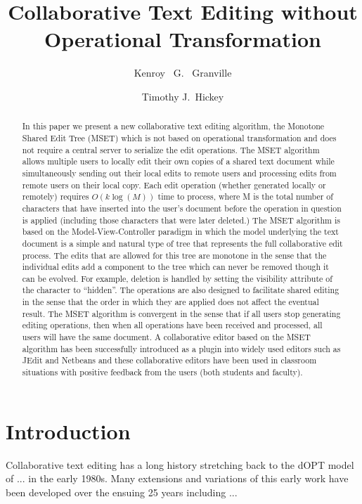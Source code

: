 \documentclass{amsart}
\title{Collaborative Text Editing without Operational Transformation}
\author{
Kenroy~ G.~ Granville
\and 
Timothy J.~Hickey 
}
\begin{document}
\maketitle

\begin{abstract}
In this paper we present a new collaborative text editing algorithm,  
the Monotone Shared Edit Tree (MSET)
which is not based on operational transformation 
and does not require a central server to serialize the
edit operations.
The MSET algorithm allows multiple users to locally 
edit their own copies of a shared text document
while simultaneously sending out their local edits 
to remote users and processing edits from remote users 
on their local copy.
Each edit operation (whether generated locally or remotely) 
requires $O(k\log(M))$ time to process, where
M is the total number of characters that have inserted 
into the user's document before the operation in
question is applied (including those characters that were later deleted.)
The MSET algorithm is based on 
the Model-View-Controller paradigm in which the
model underlying the text document is a simple and 
natural type of tree that represents the full collaborative edit process.
The edits that are allowed for this tree are monotone in the sense that
the individual edits add a component to the tree which can never be removed
though it can be evolved. For example, deletion is handled by setting the
visibility attribute of the character to ``hidden''. The operations are also
designed to facilitate shared editing in the sense that the order in which
they are applied does not affect the eventual result.
The MSET algorithm is convergent in the sense that 
if all users stop generating
editing operations, then when all operations have 
been received and processed, all users will have
the same document. 
A collaborative editor based on the MSET algorithm 
has been successfully introduced as a plugin into widely used
editors such as JEdit and Netbeans and 
these collaborative editors have been used in classroom situations
with positive feedback from the users (both students and faculty).
\end{abstract}
\newpage
\tableofcontents
\newpage

\newpage
\section{Introduction}
Collaborative text editing has a long history stretching back to the dOPT model of ... in the early 1980s.
Many extensions and variations of this early work have been developed over the ensuing 25 years including
...
\end{document}
